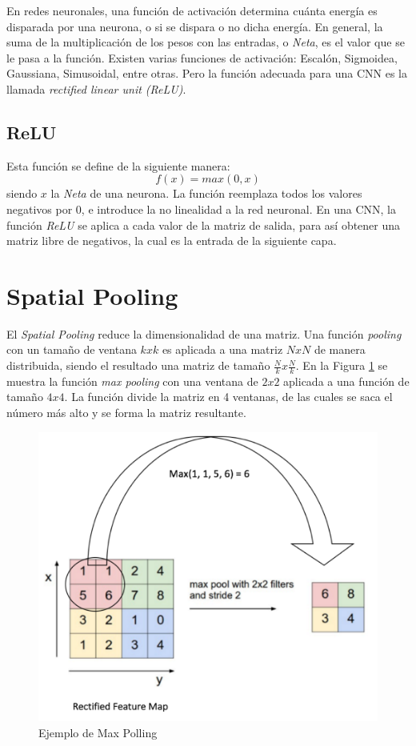 \documentclass[a4paper,12pt]{article}
\begin{document}
En redes neuronales, una función de activación determina cuánta energía es disparada por una neurona, o si se dispara o no dicha
energía. En general, la suma de la multiplicación de los pesos con las entradas, o \textit{Neta}, es el valor que se le pasa
a la función. Existen varias funciones de activación: Escalón, Sigmoidea, Gaussiana, Simusoidal, entre otras. Pero la función
adecuada para una CNN es la llamada \textit{rectified linear unit (ReLU)}.

\subsection{ReLU}

Esta función se define de la siguiente manera:
$$f(x) = max(0,x)$$
siendo $x$ la \textit{Neta} de una neurona. La función reemplaza todos los valores negativos por 0, e introduce la no linealidad
a la red neuronal. En una CNN, la función \textit{ReLU} se aplica a cada valor de la matriz de salida, para así obtener una
matriz libre de negativos, la cual es la entrada de la siguiente capa.

\section{Spatial Pooling}

El \textit{Spatial Pooling} reduce la dimensionalidad de una matriz. Una función \textit{pooling} con un tamaño de ventana $kxk$
es aplicada a una matriz $NxN$ de manera distribuida, siendo el resultado una matriz de tamaño $\frac{N}{k} x \frac{N}{k}$. 
En la Figura \ref{fig:pool} se muestra la función \textit{max pooling} con una ventana de $2x2$ aplicada a una función de tamaño $4x4$.
La función divide la matriz en 4 ventanas, de las cuales se saca el número más alto y se forma la matriz resultante.

\begin{figure}
 \centering
 \includegraphics[scale = 0.8]{1.png}
 \caption{Ejemplo de Max Polling \cite{Stan1}}
 \label{fig:pool}
\end{figure}
\end{document}
